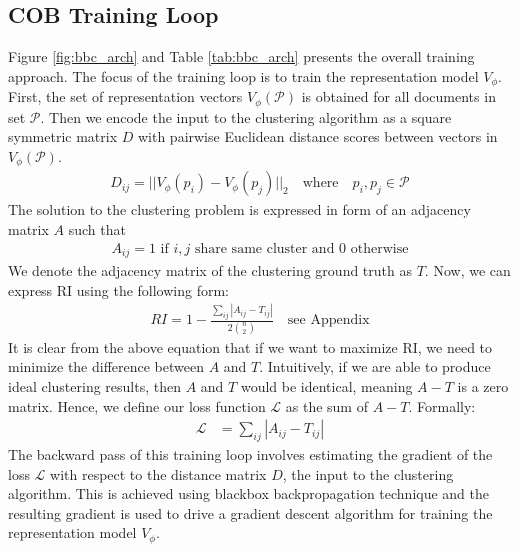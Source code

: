 \documentclass[11pt,a4paper]{article}
\begin{document}
\subsection{COB Training Loop}
Figure \ref{fig:bbc_arch} and Table \ref{tab:bbc_arch} presents the overall training approach. The focus of the training loop is to train the representation model $V_\phi$. First, the set of representation vectors $V_\phi(\mathcal{P})$ is obtained for all documents in set $\mathcal{P}$. Then we encode the input to the clustering algorithm as a square symmetric matrix $D$ with pairwise Euclidean distance scores between vectors in $V_\phi(\mathcal{P})$. 
\begin{align*}
D_{ij} = ||V_\phi(p_i) - V_\phi(p_j)||_2 \quad \textrm{where} \quad p_i,p_j \in \mathcal{P}    
\end{align*}
The solution to the clustering problem is expressed in form of an adjacency matrix $A$ such that
\begin{align*}
A_{ij} = 1 \textrm{ if } i,j \textrm{ share same cluster and } 0 \textrm{ otherwise}    
\end{align*}
We denote the adjacency matrix of the clustering ground truth as $T$. Now, we can express RI using the following form:
\begin{align*}
    RI=1-\frac{\sum_{ij} |A_{ij}-T_{ij}|}{2\binom{n}{2}} \quad \textrm{see Appendix}
\end{align*}
It is clear from the above equation that if we want to maximize RI, we need to minimize the difference between $A$ and $T$. Intuitively, if we are able to produce ideal clustering results, then $A$ and $T$ would be identical, meaning $A-T$ is a zero matrix. Hence, we define our loss function $\mathcal{L}$ as the sum of $A-T$. Formally:
\begin{align*}
\mathcal{L} &= \sum_{ij}|A_{ij}-T_{ij}| 
\end{align*}
The backward pass of this training loop involves estimating the gradient of the loss $\mathcal{L}$ with respect to the distance matrix $D$, the input to the clustering algorithm. This is achieved using blackbox backpropagation technique and the resulting gradient is used to drive a gradient descent algorithm for training the representation model $V_\phi$. 
\end{document}
